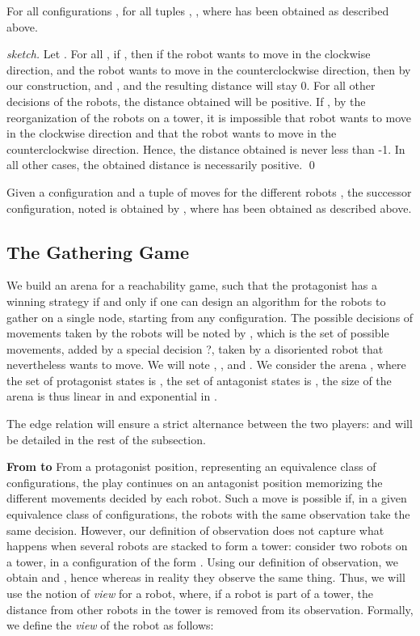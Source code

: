 \documentclass[envcountsame]{llncs} \usepackage[english]{babel}
\newcommand{\disoriented}{?}
\begin{document}
 \begin{proposition}
For all configurations , for all tuples , ,
where  has been obtained as described above.
 \end{proposition}
 
 \begin{proof}[sketch]
 Let . For all , if , then if the robot  wants to move in the clockwise direction, and the robot
  wants to move in the counterclockwise direction, then by our construction,  and , and the resulting distance will
 stay 0. For all other decisions of the robots, the distance obtained will be positive. If , by the reorganization of the robots on a tower, it is impossible
 that robot  wants to move in the clockwise direction and that the robot  wants to move in the counterclockwise direction. Hence, the distance obtained
 is never less than -1. In all other cases, the obtained distance is necessarily positive.
 \qed\end{proof} 
 
 \begin{definition}
 Given a configuration  and a tuple of moves for the different robots , the successor configuration, noted
  is obtained by , where  has been obtained as described above.
 \end{definition}
 
  
\subsection{The Gathering Game}
We build an arena for a reachability game, such that the protagonist has a winning strategy if and only if one can design an algorithm for the robots to gather on a single node, starting from any configuration. The possible decisions of movements taken by the robots will be noted by , which is the set  of possible movements, added by a special decision \disoriented, taken by a disoriented robot that
nevertheless wants to move. We will note , , 
and .
We consider the arena , where the set of protagonist states is
,
the set of antagonist states is , the size of the arena is thus linear in  and exponential in .

The edge relation  will ensure a strict alternance between the two players:  and
will be detailed in the rest of the subsection.
\medskip

\textbf{From  to }
From a protagonist position, representing an equivalence class of configurations,
the play continues on an antagonist position memorizing the different movements
decided by each robot. Such a move is possible if, in a given equivalence class
of configurations, the robots with the same observation take the same decision. 
However,
our definition of observation does not capture what happens when several
robots are stacked to form a tower: 
consider two robots on a tower, in a configuration of the form
. Using our definition of observation, we obtain
 and ,
hence  whereas in reality they observe the same thing.
Thus, we will use the notion of \emph{view} for a robot, where, if a robot is part of a tower, the distance
from other robots in the tower is removed from its observation. Formally, we define the \emph{view} of the robot 
as follows:
\end{document}
